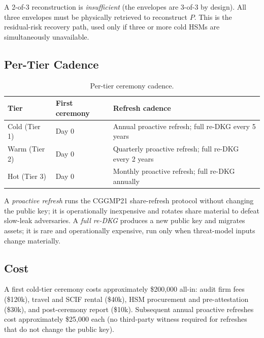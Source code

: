 A 2-of-3 reconstruction is \emph{insufficient} (the envelopes are
3-of-3 by design). All three envelopes must be physically retrieved
to reconstruct $P$. This is the residual-risk recovery path, used
only if three or more cold HSMs are simultaneously unavailable.

\subsection{Per-Tier Cadence}

\begin{table}[h]
\centering
\small
\begin{tabular}{lll}
\toprule
\textbf{Tier} & \textbf{First ceremony} & \textbf{Refresh cadence} \\
\midrule
Cold (Tier 1) & Day 0 & Annual proactive refresh; full re-DKG every 5 years \\
Warm (Tier 2) & Day 0 & Quarterly proactive refresh; full re-DKG every 2 years \\
Hot (Tier 3)  & Day 0 & Monthly proactive refresh; full re-DKG annually \\
\bottomrule
\end{tabular}
\caption{Per-tier ceremony cadence.}
\label{tab:cadence}
\end{table}

A \emph{proactive refresh} runs the CGGMP21 share-refresh protocol
without changing the public key; it is operationally inexpensive
and rotates share material to defeat slow-leak adversaries. A
\emph{full re-DKG} produces a new public key and migrates assets;
it is rare and operationally expensive, run only when threat-model
inputs change materially.

\subsection{Cost}

A first cold-tier ceremony costs approximately \$200{,}000 all-in:
audit firm fees (\$120k), travel and SCIF rental (\$40k), HSM
procurement and pre-attestation (\$30k), and post-ceremony report
(\$10k). Subsequent annual proactive refreshes cost approximately
\$25{,}000 each (no third-party witness required for refreshes that
do not change the public key).

